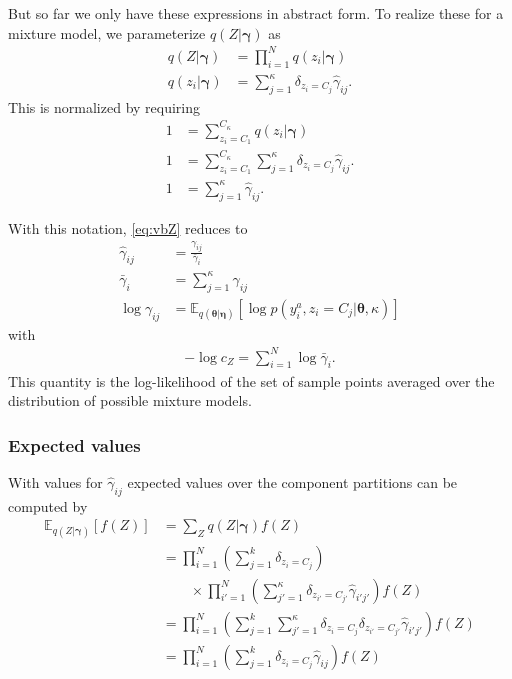 \documentclass[aps,showpacs,twocolumn,prd,superscriptaddress,nofootinbib]{revtex4}
\newcommand{\nn}{\nonumber}
\newcommand{\E}[1]{{\mathbb E}_{#1}\!}
\begin{document}
But so far we only have these expressions in abstract form. To realize these for a mixture model, we parameterize $q(Z|\bm\gamma)$ as
\begin{align}
q(Z|\bm\gamma)&=\prod_{i=1}^Nq(z_i|\bm\gamma)\\
q(z_i|\bm\gamma)&=\sum_{j=1}^\kappa\delta_{z_i{=}C_j}\hat\gamma_{ij}.
\end{align}
This is normalized by requiring
\begin{align}
1&=\sum_{z_i=C_1}^{C_\kappa} q(z_i|\bm\gamma)\\
1&=\sum_{z_i=C_1}^{C_\kappa}\sum_{j=1}^\kappa\delta_{z_i{=}C_j}\hat\gamma_{ij}.\\
1&=\sum_{j=1}^\kappa\hat\gamma_{ij}.
\end{align}

With this notation, \eqref{eq:vbZ} reduces to
\begin{align}
\hat\gamma_{ij}&=\frac{\gamma_{ij}}{\bar\gamma_{i}}\label{eq:vbZmix}\\
\bar\gamma_{i}&=\sum_{j=1}^\kappa{\gamma_{ij}}\nn\\
\log\gamma_{ij}&=\E{q(\bm\theta|\bm\eta)}\left[\log p(y_i^a,z_i{=}C_j|\bm\theta,\kappa)\right]\nn
\end{align}
with
\begin{align}
  -\log c_Z = \sum_{i=1}^N\log\bar\gamma_i.
\end{align}
This quantity is the log-likelihood of the set of sample points averaged over the distribution of possible mixture models.

\subsubsection{Expected values}

With values for $\hat\gamma_{ij}$ expected values over the component partitions can be computed by
\begin{align*}
\E{q(Z|\bm\gamma)}\left[f(Z)\right]&=\sum_{Z}q(Z|\bm\gamma)f(Z)\nn\\
&=\prod_{i=1}^N\left(\sum_{j=1}^k\delta_{z_i{=}C_j}\right)\nn\\
&\qquad\times\prod_{i'=1}^N\left(\sum_{j'=1}^\kappa\delta_{z_{i'}{=}C_{j'}}\hat\gamma_{i'j'}\right)f(Z)\nn\\
&=\prod_{i=1}^N\left(\sum_{j=1}^k\sum_{j'=1}^\kappa\delta_{z_i{=}C_j}\delta_{z_{i'}{=}C_{j'}}\hat\gamma_{i'j'}\right)f(Z)\nn\\
&=\prod_{i=1}^N\left(\sum_{j=1}^k\delta_{z_i{=}C_j}\hat\gamma_{ij}\right)f(Z)
\end{align*}
\end{document}
